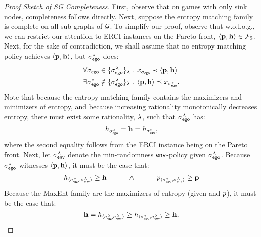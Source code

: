 \begin{proof}[Proof Sketch of SG Completeness]
  First, observe that on games with only sink nodes, completeness
  follows directly.  Next, suppose the entropy matching family is
  complete on all sub-graphs of $\mathcal{G}$. To simplify our proof, observe
  that w.o.l.o.g., we can restrict our attention to ERCI instances
  on the Pareto front, $\langle \mathbf{p},\mathbf{h}\rangle \in \mathcal{F}_{\mathbb{S}}$.
  Next, for the sake of contradiction, we shall assume that no entropy
  matching policy achieves $\langle \mathbf{p},\mathbf{h}\rangle$,
  but $\sigma_{\mathsf{ego}}^*$ does:
  \begin{align}
    &\forall \sched_\pOne \in \{\sched_{\pOne}^\rat\}_\rat~.~ x_{\sched_{\pOne}} \prec \langle \scthreshold, \randomness \rangle\label{eq:reject}\\
    &\exists \sched_\pOne^* \notin \{\sched_{\pOne}^\rat\}_\rat~.~  \langle \scthreshold, \randomness \rangle \preceq x_{\sched_{\pOne}^*}\label{eq:incomplete}.
  \end{align}
  Note that because the entropy matching family contains the maximizers and minimizers
  of entropy, and because increasing rationality monotonically decreases entropy,
  there must exist some rationality, $\lambda$, such that $\sigma_{\mathsf{ego}}^\lambda$ has:
  \begin{equation}
    h_{\sigma_{\mathsf{ego}}^\lambda} = \mathbf{h} = h_{\sigma_{\mathsf{ego}}^*},
  \end{equation}
  where the second equality follows from the ERCI instance being on the Pareto front.
  Next, let $\sigma_{\mathsf{env}}^\lambda$ denote the min-randomness
  $\mathsf{env}$-policy given $\sigma_{\mathsf{ego}}^{\lambda}$. Because $\sigma_{\mathsf{ego}}^*$
  witnesses $\langle\mathbf{p}, \mathbf{h}\rangle$, it must be the case
  that:
  \begin{equation}\label{eq:pareto_bound_for_rat}
    \rndp_{\langle \sched_\pOne^*, \sched_\pTwo^\rat \rangle} \geq \randomness
    \hspace{3em} \wedge \hspace{3em}
    \scp_{\langle \sched_\pOne^*, \sched_\pTwo^\rat\rangle} \geq \scthreshold
  \end{equation}
  Because the MaxEnt family are the maximizers of entropy (given and $p$),
  it must be the case that:
  \begin{equation}
    \mathbf{h} = h_{\langle \sigma_{\mathsf{ego}}^\lambda \sigma_{\mathsf{env}}^\lambda \rangle} \geq  h_{\langle \sigma_{\mathsf{ego}}^*, \sigma_{\mathsf{env}}^\lambda \rangle}\geq \mathbf{h},
  \end{equation}

\end{proof}
